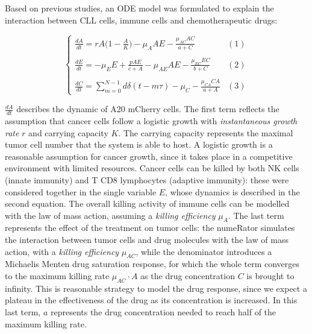 Based on previous studies, an ODE model was formulated to explain the interaction between CLL cells, immune cells and chemotherapeutic drugs:

\[
\begin{cases} 
	\frac{dA}{dt} = rA \bigl( 1 - \frac{A}{K} \bigr) - \mu_A AE - \frac{\mu_{AC} AC}{a+C} & (1)\\ \\
	\frac{dE}{dt} = -\mu_E E + \frac{pAE}{c+A} - \mu_{AE} AE - \frac{\mu_{EC} EC}{b+C} & (2) \\ \\
	\frac{dC}{dt} = \sum_{m=0}^{N-1} d\delta (t-m\tau) - \mu_{C} - \frac{\mu_{CA} CA}{a+A} & (3) 
\end{cases}
\]

$\frac{dA}{dt}$ describes the dynamic of A20 mCherry cells. The first term reflects the assumption that cancer cells follow a logistic growth with \textit{instantaneous growth rate} $r$ and carrying capacity $K$. The carrying capacity represents the maximal tumor cell number that the system is able to host. A logistic growth is a reasonable assumption for cancer growth, since it takes place in a competitive environment with limited resources. Cancer cells can be killed by both NK cells (innate immunity) and T CD8 lymphocytes (adaptive immunity): these were considered together in the single variable $E$, whose dynamics is described in the second equation. The overall killing activity of immune cells can be modelled with the law of mass action, assuming a \textit{killing efficiency} $\mu_{A}$. The last term represents the effect of the treatment on tumor cells: the numeRator simulates the interaction between tumor cells and drug molecules with the law of mass action, with a \textit{killing efficiency} $\mu_{AC}$, while the denominator introduces a Michaelis Menten drug saturation response, for which the whole term converges to the maximum killing rate $\mu_{AC} \cdot A$ as the drug concentration $C$ is brought to infinity. This is reasonable strategy to model the drug response, since we expect a plateau in the effectiveness of the drug as its concentration is increased. In this last term, $a$ represents the drug concentration needed to reach half of the maximum killing rate. \par
\vspace{0.4cm}
